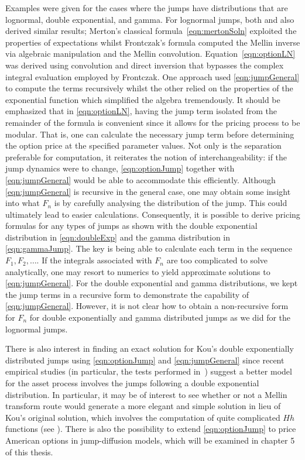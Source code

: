 Examples were given for the cases where the jumps have distributions that are lognormal, double exponential, and gamma. For lognormal jumps, both \cite{Merton1976} and \cite{Frontczak2013} also derived similar results; Merton's classical formula~\eqref{eqn:mertonSoln} exploited the properties of expectations whilst Frontczak's formula computed the Mellin inverse via algebraic manipulation and the Mellin convolution. Equation~\eqref{eqn:optionLN} was derived using convolution and direct inversion that bypasses the complex integral evaluation employed by Frontczak. One approach used \eqref{eqn:jumpGeneral} to compute the terms recursively whilst the other relied on the properties of the exponential function which simplified the algebra tremendously. It should be emphasized that in \eqref{eqn:optionLN}, having the jump term isolated from the remainder of the formula is convenient since it allows for the pricing process to be modular. That is, one can calculate the necessary jump term before determining the option price at the specified parameter values. Not only is the separation preferable for computation, it reiterates the notion of interchangeability: if the jump dynamics were to change, \eqref{eqn:optionJump} together with \eqref{eqn:jumpGeneral} would be able to accommodate this efficiently. %
Although \eqref{eqn:jumpGeneral} is recursive in the general case, one may obtain some insight into what $F_n$ is by carefully analysing the distribution of the jump. This could ultimately lead to easier calculations. Consequently, it is possible to derive pricing formulas for any types of jumps as shown with the double exponential distribution in \eqref{eqn:doubleExp} and the gamma distribution in \eqref{eqn:gammaJump}. The key is being able to calculate each term in the sequence $F_1, F_2, \ldots$. If the integrals associated with $F_n$ are too complicated to solve analytically, one may resort to numerics to yield approximate solutions to \eqref{eqn:jumpGeneral}. For the double exponential and gamma distributions, we kept the jump terms in a recursive form to demonstrate the capability of \eqref{eqn:jumpGeneral}. However, it is not clear how to obtain a non-recursive form for $F_n$ for double exponentially and gamma distributed jumps as we did for the lognormal jumps.

There is also interest in finding an exact solution for Kou's double exponentially distributed jumps \cite{Kou2002, Kou2004} using \eqref{eqn:optionJump} and \eqref{eqn:jumpGeneral} since recent empirical studies (in particular, the tests performed in~\cite{Ramezani1998}) suggest a better model for the asset process involves the jumps following a double exponential distribution. In particular, it may be of interest to see whether or not a Mellin transform route would generate a more elegant and simple solution in lieu of Kou's original solution, which involves the computation of quite complicated $Hh$ functions (see \cite[pp. 691]{Abramowitz1972}). There is also the possibility to extend \eqref{eqn:optionJump} to price American options in jump-diffusion models, which will be examined in chapter 5 of this thesis.
	
